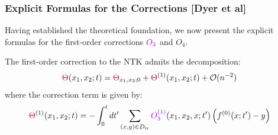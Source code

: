 \documentclass[a4paper]{article}
\theoremstyle{plain}
\theoremstyle{definition}
\theoremstyle{remark}
\begin{document}
\subsubsection{Explicit Formulas for the Corrections [Dyer et al]}

Having established the theoretical foundation, we now present the explicit formulas for the first-order corrections $\textcolor{k3color}{O_3}$ and $O_4$.

\begin{tcolorbox}[colback=theoremcolor!10,colframe=theoremcolor!60!black,title={\textbf{Theorem (First-order correction to the NTK)}},enhanced,drop shadow]\label{thm:corrections}
The first-order correction to the NTK admits the decomposition:
\begin{align}
\textcolor{purple}{\Theta}(x_1,x_2;t) &= \textcolor{purple}{\Theta}_{x_1,x_2;0} + \textcolor{purple}{\Theta}^{(1)}(x_1,x_2;t) + \mathcal{O}(n^{-2}) \label{eq:theta_expansion}
\end{align}
where the correction term is given by:
\begin{align}
\textcolor{purple}{\Theta}^{(1)}(x_1,x_2;t) &= -\int_{0}^{t}dt'\sum_{(x,y)\in D_{\rm tr}}\textcolor{k3color}{O^{(1)}_{3}}(x_1,x_2,x;t')\left(f^{(0)}(x;t')-y\right) \label{eq:theta_correction}
\end{align}
\end{tcolorbox}
\end{document}
